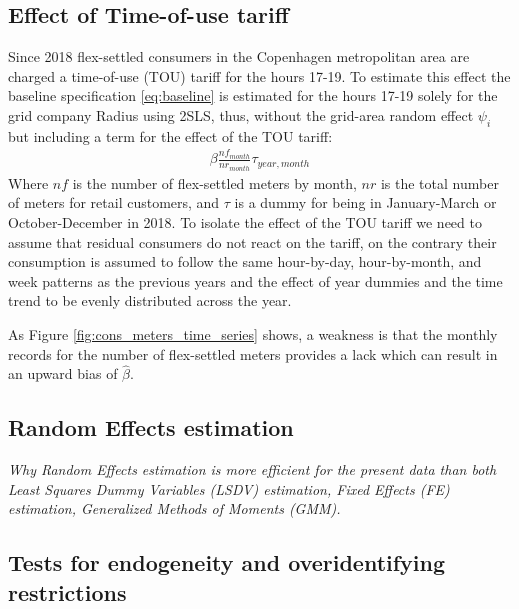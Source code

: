 \subsection{Effect of Time-of-use tariff}
\label{subsec:e_tout}
Since 2018 flex-settled consumers in the Copenhagen metropolitan area are charged a time-of-use (TOU) tariff for the hours 17-19. To estimate this effect the baseline specification \ref{eq:baseline} is estimated for the hours 17-19 solely for the grid company Radius using 2SLS, thus, without the grid-area random effect $\psi_i$ but including a term for the effect of the TOU tariff:
\begin{align}
  \beta\frac{nf_{month}}{nr_{month}}\tau_{year,month}
  \label{eq:tout}
\end{align}
Where $nf$ is the number of flex-settled meters by month, $nr$ is the total number of meters for retail customers, and $\tau$ is a dummy for being in January-March or October-December in 2018. To isolate the effect of the TOU tariff we need to assume that residual consumers do not react on the tariff, on the contrary their consumption is assumed to follow the same hour-by-day, hour-by-month, and week patterns as the previous years and the effect of year dummies and the time trend to be evenly distributed across the year.\par
As Figure \ref{fig:cons_meters_time_series} shows, a weakness is that the monthly records for the number of flex-settled meters provides a lack which can result in an upward bias of $\hat{\beta}$.


\subsection{Random Effects estimation}
\label{subsec:e_re}
\textit{Why Random Effects estimation is more efficient for the present data than both Least Squares Dummy Variables (LSDV) estimation, Fixed Effects (FE) estimation, Generalized Methods of Moments (GMM).}

\subsection{Tests for endogeneity and overidentifying restrictions}
\label{subsec:e_re}



